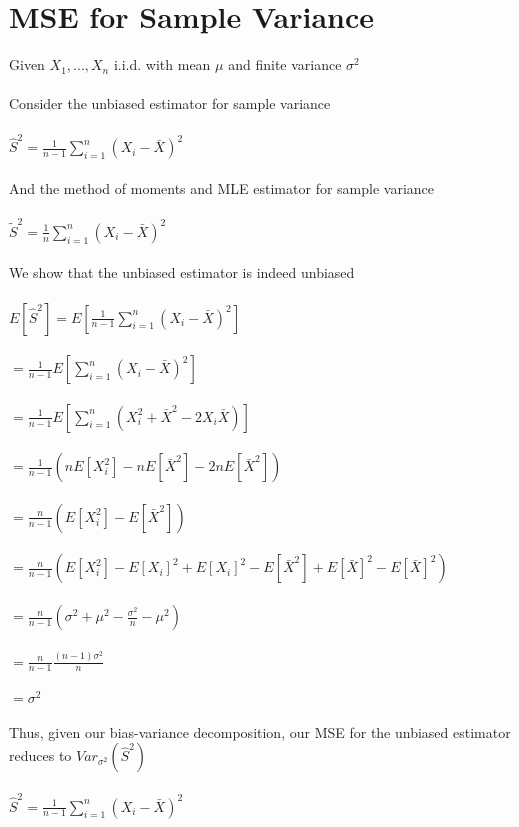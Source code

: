 \documentclass{article}
\begin{document}
\section{MSE for Sample Variance}
Given $X_1,...,X_n$ i.i.d. with mean $\mu$ and finite variance $\sigma^2$\\\\
Consider the unbiased estimator for sample variance\\\\
$\hat{S}^2=\frac{1}{n-1}\sum_{i=1}^n(X_i-\bar{X})^2$\\\\
And the method of moments and MLE estimator for sample variance\\\\
$\tilde{S}^2=\frac{1}{n}\sum_{i=1}^n(X_i-\bar{X})^2$\\\\
We show that the unbiased estimator is indeed unbiased\\\\ 
$E[\hat{S}^2]=E[\frac{1}{n-1}\sum_{i=1}^n(X_i-\bar{X})^2]$\\\\
$=\frac{1}{n-1}E[\sum_{i=1}^n(X_i-\bar{X})^2]$\\\\
$=\frac{1}{n-1}E[\sum_{i=1}^n(X_i^2+\bar{X}^2-2X_i\bar{X})]$\\\\
$=\frac{1}{n-1}(nE[X_i^2]-nE[\bar{X}^2]-2nE[\bar{X}^2])$\\\\
$=\frac{n}{n-1}(E[X_i^2]-E[\bar{X}^2])$\\\\
$=\frac{n}{n-1}(E[X_i^2]-E[X_i]^2+E[X_i]^2-E[\bar{X}^2]+E[\bar{X}]^2-E[\bar{X}]^2)$\\\\
$=\frac{n}{n-1}(\sigma^2+\mu^2-\frac{\sigma^2}{n}-\mu^2)$\\\\
$=\frac{n}{n-1}\frac{(n-1)\sigma^2}{n}$\\\\
$=\sigma^2$\\\\
Thus, given our bias-variance decomposition, our MSE for the unbiased estimator reduces to $Var_{\sigma^2}(\hat{S}^2)$\\\\
$\hat{S}^2=\frac{1}{n-1}\sum_{i=1}^n(X_i-\bar{X})^2$\\\\
\end{document}
